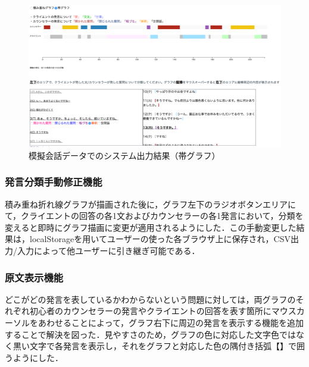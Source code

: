 \documentclass[shuuron]{kuee}
\begin{document}
\begin{figure}
  \begin{center}
    \includegraphics[width=\linewidth]{obi.png}
  \end{center}
  \caption{模擬会話データでのシステム出力結果（帯グラフ）}
  \label{fig:obi}
\end{figure}

\subsubsection{発言分類手動修正機能}
積み重ね折れ線グラフが描画された後に，グラフ左下のラジオボタンエリアにて，クライエントの回答の各1文およびカウンセラーの各1発言において，分類を変えると即時にグラフ描画に変更が適用されるようにした．この手動変更した結果は，localStorageを用いてユーザーの使った各ブラウザ上に保存され，CSV出力/入力によって他ユーザーに引き継ぎ可能である．


\subsubsection{原文表示機能}

どこがどの発言を表しているかわからないという問題に対しては，両グラフのそれぞれ初心者のカウンセラーの発言やクライエントの回答を表す箇所にマウスカーソルをあわせることによって，グラフ右下に周辺の発言を表示する機能を追加することで解決を図った．見やすさのため，グラフの色に対応した文字色ではなく黒い文字で各発言を表示し，それをグラフと対応した色の隅付き括弧【】で囲うようにした．
\end{document}
